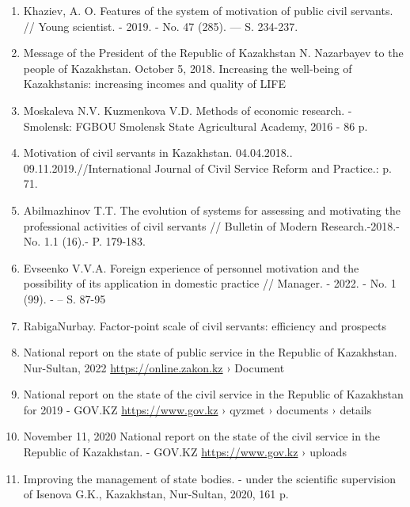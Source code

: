 \begin{enumerate}
\item
Khaziev, A. O. Features of the system of motivation of public civil
servants. // Young scientist. - 2019. - No. 47 (285). --- S. 234-237.

\item
Message of the President of the Republic of Kazakhstan N. Nazarbayev
to the people of Kazakhstan. October 5, 2018. Increasing the well-being
of Kazakhstanis: increasing incomes and quality of LIFE

\item
Moskaleva N.V. Kuzmenkova V.D. Methods of economic research. -
Smolensk: FGBOU Smolensk State Agricultural Academy, 2016 - 86 p.

\item
Motivation of civil servants in Kazakhstan. 04.04.2018..
09.11.2019.//International Journal of Civil Service Reform and
Practice.: p. 71.

\item
Abilmazhinov T.T. The evolution of systems for assessing and
motivating the professional activities of civil servants // Bulletin of
Modern Research.-2018.- No. 1.1 (16).- P. 179-183.

\item
Evseenko V.V.A. Foreign experience of personnel motivation and the
possibility of its application in domestic practice // Manager. - 2022.
- No. 1 (99). - -- S. 87-95

\item
RabigaNurbay. Factor-point scale of civil servants: efficiency and
prospects

\item
National report on the state of public service in the Republic of
Kazakhstan. Nur-Sultan, 2022 \url{https://online.zakon.kz} › Document

\item
National report on the state of the civil service in the Republic of
Kazakhstan for 2019 - GOV.KZ \url{https://www.gov.kz} › qyzmet › documents ›
details

\item
November 11, 2020 National report on the state of the civil service
in the Republic of Kazakhstan. - GOV.KZ \url{https://www.gov.kz} › uploads

\item
Improving the management of state bodies. - under the scientific
supervision of Isenova G.K., Kazakhstan, Nur-Sultan, 2020, 161 p.


\end{enumerate}
